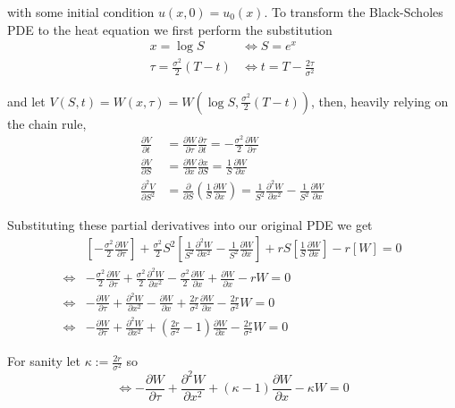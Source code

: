\documentclass[12pt]{article}
\begin{document}
with some initial condition $u(x, 0) = u_0(x)$. To transform the Black-Scholes PDE to the heat equation we first perform the substitution
\begin{align*}
	x = \log S &\iff S = e^x \\
	\tau = \frac{\sigma^2}{2} (T - t) &\iff t = T - \frac{2\tau}{\sigma^2}
\end{align*}

and let $V(S, t) = W(x, \tau) = W \left( \log S, \frac{\sigma^2}{2}(T - t) \right)$, then, heavily relying on the chain rule,
\begin{align*}
	\frac{\partial V}{\partial t} &= \frac{\partial W}{\partial \tau}\frac{\partial \tau}{\partial t} = -\frac{\sigma^2}{2}\frac{\partial W}{\partial \tau} \\
	\frac{\partial V}{\partial S} &= \frac{\partial W}{\partial x} \frac{\partial x}{\partial S} = \frac{1}{S}\frac{\partial W}{\partial x} \\
	\frac{\partial^2 V}{\partial S^2} &= \frac{\partial}{\partial S} \left( \frac{1}{S} \frac{\partial W}{\partial x} \right) = \frac{1}{S^2}\frac{\partial^2 W}{\partial x^2} - \frac{1}{S^2}\frac{\partial W}{\partial x}
\end{align*}

Substituting these partial derivatives into our original PDE we get
\begin{align*}
	& \left[ -\frac{\sigma^2}{2}\frac{\partial W}{\partial \tau} \right] + \frac{\sigma^2}{2}S^2\left[ \frac{1}{S^2}\frac{\partial^2 W}{\partial x^2} - \frac{1}{S^2}\frac{\partial W}{\partial x} \right] + rS\left[ \frac{1}{S}\frac{\partial W}{\partial x} \right] - r\left[ W \right] = 0 \\
	\iff& -\frac{\sigma^2}{2}\frac{\partial W}{\partial \tau} + \frac{\sigma^2}{2}\frac{\partial^2 W}{\partial x^2} - \frac{\sigma^2}{2}\frac{\partial W}{\partial x} + \frac{\partial W}{\partial x} - rW = 0 \\
	\iff& -\frac{\partial W}{\partial \tau} + \frac{\partial^2 W}{\partial x^2} -\frac{\partial W}{\partial x} + \frac{2r}{\sigma^2}\frac{\partial W}{\partial x} - \frac{2r}{\sigma^2}W = 0 \\
	\iff& -\frac{\partial W}{\partial \tau} + \frac{\partial^2 W}{\partial x^2} + \left( \frac{2r}{\sigma^2} - 1 \right) \frac{\partial W}{\partial x} - \frac{2r}{\sigma^2}W = 0
\end{align*}

For sanity let $\kappa := \frac{2r}{\sigma^2}$ so
\begin{equation*}
	\iff -\frac{\partial W}{\partial \tau} + \frac{\partial^2 W}{\partial x^2} + \left( \kappa - 1 \right) \frac{\partial W}{\partial x} - \kappa W = 0
\end{equation*}
\end{document}
